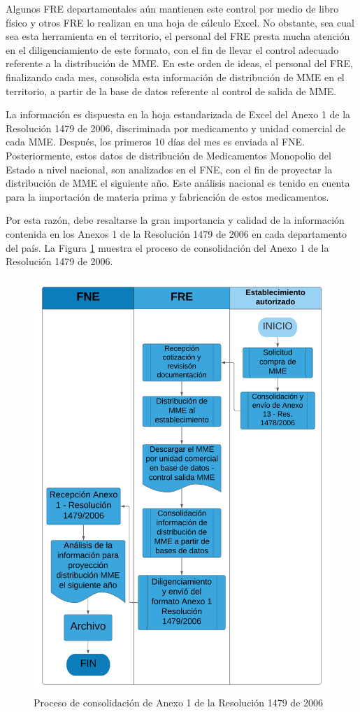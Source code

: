 \documentclass[
]{book}
\begin{document}
Algunos FRE departamentales aún mantienen este control por medio de libro físico y otros FRE lo realizan en una hoja de cálculo Excel. No obstante, sea cual sea esta herramienta en el territorio, el personal del FRE presta mucha atención en el diligenciamiento de este formato, con el fin de llevar el control adecuado referente a la distribución de MME. En este orden de ideas, el personal del FRE, finalizando cada mes, consolida esta información de distribución de MME en el territorio, a partir de la base de datos referente al control de salida de MME.

La información es dispuesta en la hoja estandarizada de Excel del Anexo 1 de la Resolución 1479 de 2006, discriminada por medicamento y unidad comercial de cada MME. Después, los primeros 10 días del mes es enviada al FNE. Posteriormente, estos datos de distribución de Medicamentos Monopolio del Estado a nivel nacional, son analizados en el FNE, con el fin de proyectar la distribución de MME el siguiente año. Este análisis nacional es tenido en cuenta para la importación de materia prima y fabricación de estos medicamentos.

Por esta razón, debe resaltarse la gran importancia y calidad de la información contenida en los Anexos 1 de la Resolución 1479 de 2006 en cada departamento del país. La Figura \ref{fig:procesoA1-1479} muestra el proceso de consolidación del Anexo 1 de la Resolución 1479 de 2006.

\begin{figure}

{\centering \includegraphics[width=0.8\linewidth]{figures/Consolidacion_A1_Res_1479_2006} 

}

\caption{Proceso de consolidación de Anexo 1 de la Resolución 1479 de 2006}\label{fig:procesoA1-1479}
\end{figure}
\end{document}
